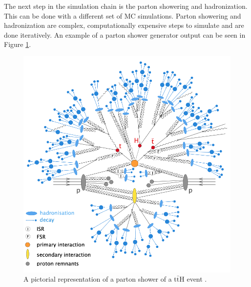 		The next step in the simulation chain is the parton showering and hadronization. This can be done with a different set of \gls{MC} simulations. Parton showering and hadronization are complex, computationally expensive steps to simulate and are done iteratively. An example of a parton shower generator output can be seen in Figure \ref{fig:hadronization}.

		\begin{figure}[!ht]
		\centering
		\includegraphics[width=\textwidth,keepaspectratio=true]{chapters/chapter4_simulation/images/tth_hadronization_gen.png}
		\caption{\label{fig:hadronization} A pictorial representation of a parton shower of a t$\bar{\mathrm{t}}$H event \cite{Wanotayaroj:2242196}.}
		\end{figure}	


